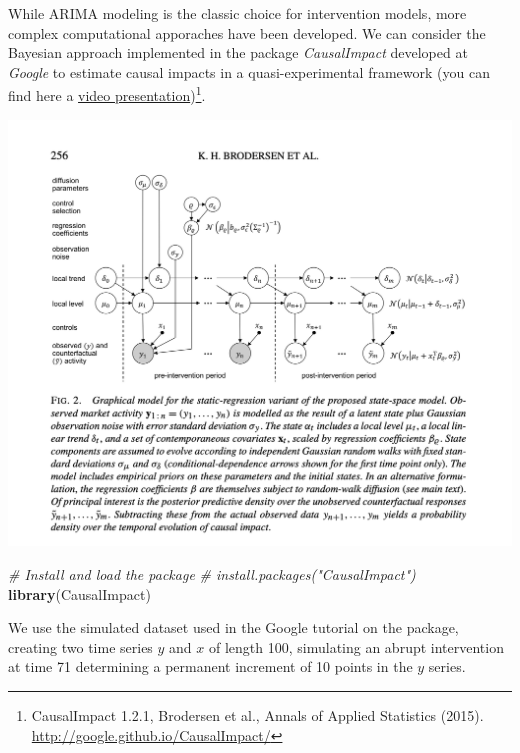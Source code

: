 \documentclass[
]{article}
\newenvironment{Shaded}{\begin{snugshade}}{\end{snugshade}}
\newcommand{\CommentTok}[1]{\textcolor[rgb]{0.56,0.35,0.01}{\textit{#1}}}
\newcommand{\KeywordTok}[1]{\textcolor[rgb]{0.13,0.29,0.53}{\textbf{#1}}}
\newcommand{\NormalTok}[1]{#1}
\begin{document}
While ARIMA modeling is the classic choice for intervention models, more complex computational apporaches have been developed. We can consider the Bayesian approach implemented in the package \emph{CausalImpact} developed at \emph{Google} to estimate causal impacts in a quasi-experimental framework (you can find here a \href{https://www.youtube.com/watch?v=GTgZfCltMm8}{video presentation})\footnote{CausalImpact 1.2.1, Brodersen et al., Annals of Applied Statistics (2015). \url{http://google.github.io/CausalImpact/}}.

\includegraphics[width=20.49in]{images/causal-impact}

\begin{Shaded}
\begin{Highlighting}[]
\CommentTok{# Install and load the package}
\CommentTok{# install.packages("CausalImpact")}
\KeywordTok{library}\NormalTok{(CausalImpact)}
\end{Highlighting}
\end{Shaded}

We use the simulated dataset used in the Google tutorial on the package, creating two time series \(y\) and \(x\) of length 100, simulating an abrupt intervention at time 71 determining a permanent increment of 10 points in the \(y\) series.
\end{document}
